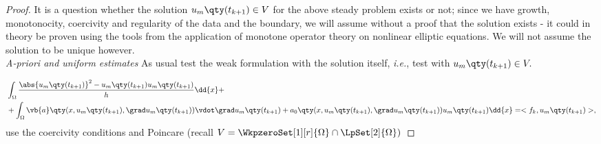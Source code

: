 \begin{proof}
	It is a question whether the solution $u_m\qty(t_{k+1}) \in V$ for the above steady problem exists or not; since we have growth, monotonocity, coercivity and regularity of the data and the boundary, we will assume without a proof that the solution exists - it could in theory be proven using the tools from the application of monotone operator theory on nonlinear elliptic equations. We will not assume the solution to be unique however.\\

	\textit{A-priori and uniform estimates}
 As usual test the weak formulation with the solution itself, \textit{i.e.}, test with $u_m\qty(t_{k+1}) \in V.$

	\begin{align*}
		&\int_{\Omega}\frac{\abs{u_m\qty(t_{k+1})}^{2} - u_m\qty(t_{k+1})u_{m}\qty(t_{k+1})}{h}\dd{x} + \\
		&+ \int_{\Omega}\vb{a}\qty(x, u_m\qty(t_{k+1}), \grad u_m\qty(t_{k+1}))\vdot \grad u_m\qty(t_{k+1}) + a_0\qty(x, u_m\qty(t_{k+1}), \grad u_m\qty(t_{k+1})) u_m\qty(t_{k+1})\dd{x} = <f_k, u_m\qty(t_{k+1})>,
	\end{align*}
	use the coercivity conditions and Poincare (recall $V = \WkpzeroSet[1][r]{\Omega} \cap \LpSet[2]{\Omega})$


\end{proof}
